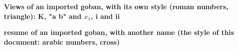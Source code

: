 \documentclass{article}
\newcommand\case[1]{\par\medskip\noindent\textbf{#1}\par\nopagebreak}
\begin{document}
\case{Views of an imported goban, with its own style (roman numbers, triangle): K, "a b" and $x_1$, i and ii}
  

\case{resume of an imported goban, with another name (the style of this document: arabic numbers, cross)}
\begin{goban}[13, resume = {other, marks, numbers}, scale = 0.5]\end{goban}
\end{document}
